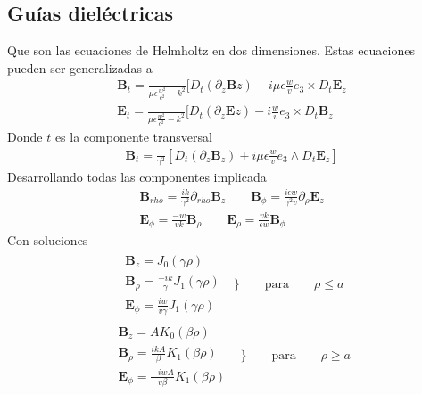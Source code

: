 \subsection{Guías dieléctricas}
Que son las ecuaciones de Helmholtz en dos dimensiones. Estas ecuaciones pueden ser generalizadas a
\begin{subequations}
	\begin{align}
	\mathbf{B}_{t}=\frac{}{\mu \epsilon\frac{w^2}{c^2}-k^2}[D_{t} (\partial_{z} \mathbf{B}{z})+i\mu\epsilon\frac{w}{v}e_{3}\times D_{t}\mathbf{E}_{z} \\
	\mathbf{E}_{t}=\frac{}{\mu \epsilon\frac{w^2}{c^2}-k^2}[D_{t} (\partial_{z} \mathbf{E}{z})-i\frac{w}{v}e_{3}\times D_{t}\mathbf{B}_{z} 
	\end{align}
	\end{subequations}
Donde $t$ es la componente transversal
\begin{subequations}
	\begin{align}
	\mathbf{B}_{t}=\frac{}{\gamma^2} [D_{t}(\partial_{z}\mathbf{B}_{z})+i\mu \epsilon \frac{w}{v} e_{3}\wedge D_{t}\mathbf{E}_{z}]
	\end{align}
\end{subequations}
Desarrollando todas las componentes implicada
\begin{subequations}
	\begin{align}
\mathbf{B}_{rho} = \frac{ik}{\gamma^2}\partial_{rho}\mathbf{B}_{z} \qquad \mathbf{B}_{\phi} = \frac{i \epsilon w}{\gamma^2 v} \partial_{\rho} \mathbf{E}_{z}\\
\mathbf{E}_{\phi} = \frac{-w}{v k }\mathbf{B}_{\rho} \qquad \mathbf{E}_{\rho} = \frac{v k}{\epsilon w} \mathbf{B}_{\phi}
	\end{align}
\end{subequations}
Con soluciones 
\begin{eqnarray}
	\begin{array}{ll}
		\mathbf{B}_{z} = J_{0}(\gamma \rho) \qquad \nonumber \\
		\mathbf{B}_{\rho } = \frac{-i k}{\gamma} J_{1} (\gamma \rho) \nonumber \\
		\mathbf{E}_{\phi} = \frac{i w}{v \gamma} J_{1} (\gamma \rho)
		\end{array} \Bigg\} \qquad \text{para}  \qquad \rho \leq a 
\end{eqnarray}
\begin{eqnarray}
\begin{array}{ll}
\mathbf{B}_{z} = A K_{0}(\beta \rho) \qquad \nonumber \\
\mathbf{B}_{\rho } = \frac{i k A}{\beta} K_{1} (\beta \rho) \nonumber \\
\mathbf{E}_{\phi} = \frac{-i w A}{v \beta} K_{1} (\beta \rho)
\end{array}  \Bigg\} \qquad \text{para}  \qquad \rho \geq a 
\end{eqnarray}
